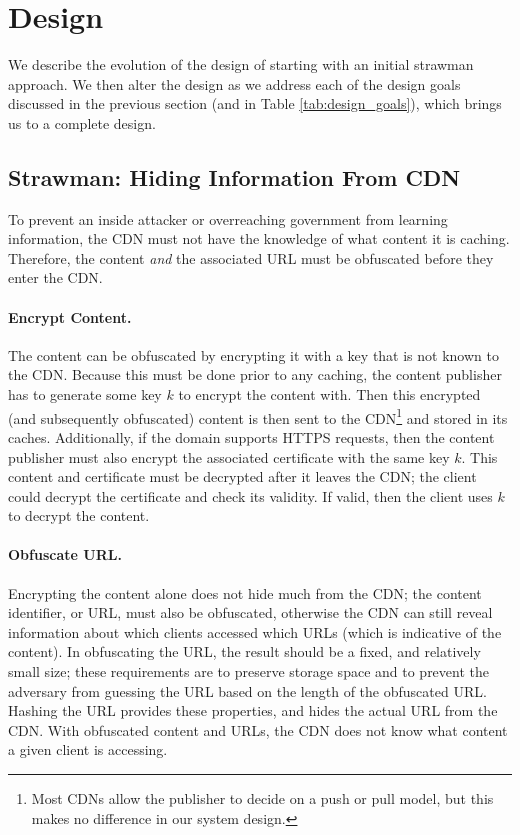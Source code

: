\section{Design}
\label{sec:design}
We describe the evolution of the design of \system{} starting with an initial strawman approach.  We then 
alter the design as we address each of the design goals discussed in the previous section (and in Table \ref{tab:design_goals}), which brings us 
to a complete design.

\subsection{Strawman: Hiding Information From CDN}
\label{sec:obfuscate_content}
To prevent an inside attacker or overreaching government from learning information, the CDN 
must not have the knowledge of what content it is caching.  Therefore, the content {\it and} the 
associated URL must be obfuscated before they enter the CDN.  

\paragraph{Encrypt Content.}  The content can be obfuscated by encrypting it with a key that is not 
known to the CDN.  Because this must be done prior to any caching, the content publisher 
has to generate some key $k$ to encrypt the content with.  Then this encrypted (and subsequently 
obfuscated) content is then sent to the CDN\footnote{Most CDNs
allow the publisher to decide on a push or pull model, but this makes no difference in our 
system design.} and stored in its caches.  
Additionally, if the domain supports HTTPS requests, then the content publisher must also encrypt the 
associated certificate with the same key $k$.  This content and certificate must be decrypted after 
it leaves the CDN; the client could decrypt the certificate and check its validity.  If valid, then 
the client uses $k$ to decrypt the content.  

\paragraph{Obfuscate URL.} Encrypting the content alone does not hide much from the CDN; the content 
identifier, or URL, must also be obfuscated, otherwise the CDN can still reveal information about 
which clients accessed which URLs (which is indicative of the content).  In obfuscating the 
URL, the result should be a fixed, and relatively small size; these requirements are to preserve 
storage space and to prevent the adversary from guessing the URL based on the length of the obfuscated 
URL.  Hashing the URL provides these 
properties, and hides the actual URL from the CDN. With obfuscated content and 
URLs, the CDN does not know what content a given client is accessing.

